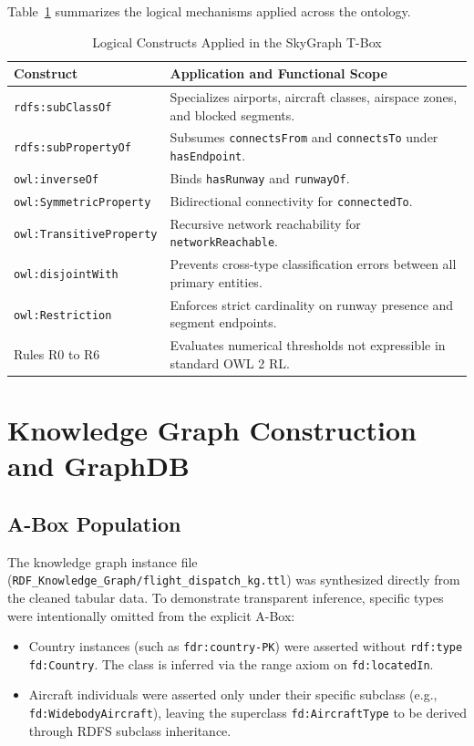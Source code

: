 \documentclass[conference]{IEEEtran}
\begin{document}
Table~\ref{tab:tbox_constructs} summarizes the logical mechanisms applied across the ontology.

\begin{table}[htbp]
\caption{Logical Constructs Applied in the SkyGraph T-Box}
\label{tab:tbox_constructs}
\centering
\begin{tabular}{lp{5.2cm}}
\toprule
\textbf{Construct} & \textbf{Application and Functional Scope} \\
\midrule
\texttt{rdfs:subClassOf} & Specializes airports, aircraft classes, airspace zones, and blocked segments. \\
\texttt{rdfs:subPropertyOf} & Subsumes \texttt{connectsFrom} and \texttt{connectsTo} under \texttt{hasEndpoint}. \\
\texttt{owl:inverseOf} & Binds \texttt{hasRunway} and \texttt{runwayOf}. \\
\texttt{owl:SymmetricProperty} & Bidirectional connectivity for \texttt{connectedTo}. \\
\texttt{owl:TransitiveProperty} & Recursive network reachability for \texttt{networkReachable}. \\
\texttt{owl:disjointWith} & Prevents cross-type classification errors between all primary entities. \\
\texttt{owl:Restriction} & Enforces strict cardinality on runway presence and segment endpoints. \\
Rules R0 to R6 & Evaluates numerical thresholds not expressible in standard OWL 2 RL. \\
\bottomrule
\end{tabular}
\end{table}

\section{Knowledge Graph Construction and GraphDB}

\subsection{A-Box Population}
The knowledge graph instance file (\texttt{RDF\_Knowledge\_Graph/flight\_dispatch\_kg.ttl}) was synthesized directly from the cleaned tabular data. To demonstrate transparent inference, specific types were intentionally omitted from the explicit A-Box:
\begin{itemize}
    \item Country instances (such as \texttt{fdr:country-PK}) were asserted without \texttt{rdf:type fd:Country}. The class is inferred via the range axiom on \texttt{fd:locatedIn}.
    \item Aircraft individuals were asserted only under their specific subclass (e.g., \texttt{fd:WidebodyAircraft}), leaving the superclass \texttt{fd:AircraftType} to be derived through RDFS subclass inheritance.
\end{itemize}
\end{document}
